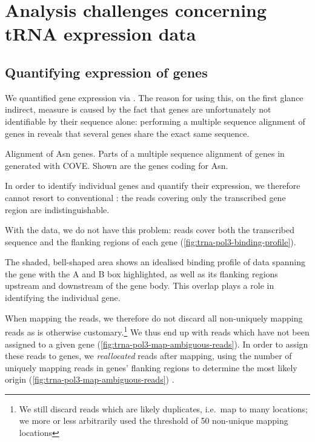 \chapter{Analysis challenges concerning tRNA expression data}

\section{Quantifying expression of \trna genes}

We quantified \trna gene expression via  \chipseq. The reason for using
this, on the first glance indirect, measure is caused by the fact that \trna
genes are unfortunately not identifiable by their sequence alone: performing a
multiple sequence alignment of \trna genes in \mmu reveals that several \trna
genes share the exact same sequence.

    {\footnotesize}
    {Alignment of Asn \trna genes.}
    {Parts of a multiple sequence alignment of \trna genes in \mmu generated
    with COVE\@. Shown are the \trna genes coding for Asn.}

In order to identify individual \trna genes and quantify their expression, we
therefore cannot resort to conventional \rnaseq: the \rna reads covering only
the transcribed gene region are indistinguishable.

With the  \chipseq data, we do not have this problem: reads cover both the
transcribed sequence and the flanking regions of each gene
(\cref{fig:trna-pol3-binding-profile}).

    {The shaded, bell-shaped area shows an idealised binding profile of \chipseq
    data spanning the \trna gene with the A and B box highlighted, as well as
    its flanking regions upstream and downstream of the gene body. This overlap
    plays a role in identifying the individual gene.}

When mapping the reads, we therefore do not discard all non-uniquely mapping
reads as is otherwise customary.\footnote{We still discard reads which are
likely \pcr duplicates, i.e.\ map to many locations; we more or less arbitrarily
used the threshold of \num{50} non-unique mapping locations} We thus end up with
reads which have not been assigned to a given \trna gene
(\cref{fig:trna-pol3-map-ambiguous-reads}). In order to assign these reads to
\trna genes, we \emph{reallocated} reads after mapping, using the number of
uniquely mapping reads in \trna genes’ flanking regions to determine the most
likely origin (\cref{fig:trna-pol3-map-ambiguous-reads}) \citep{Kutter:2011}.

